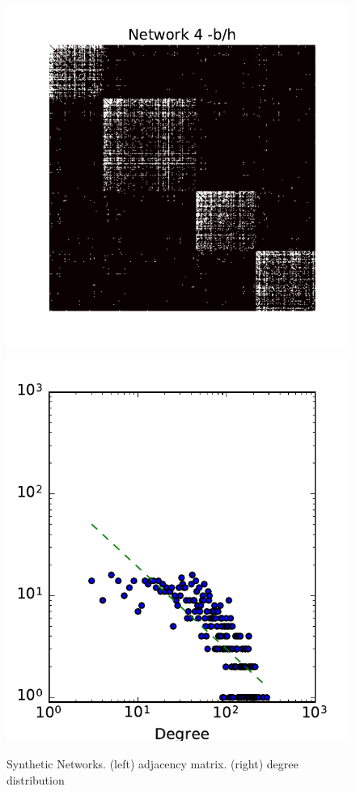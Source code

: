 \begin{figure}[h]
	\endminipage
	\vspace{-0.4cm}
	\includegraphics[scale=0.4]{img/g4}
	\endminipage
	\includegraphics[scale=0.4]{img/g4_d}
	\endminipage
	
	\caption{Synthetic Networks. (left) adjacency matrix. (right) degree distribution}
	\label{fig:synt_graph}
\end{figure}




